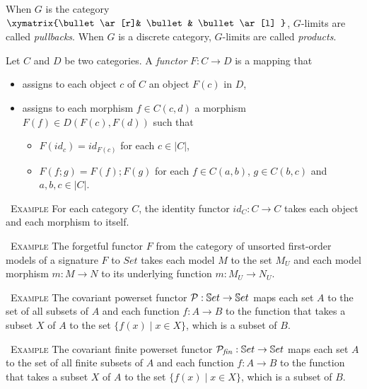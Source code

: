 \documentclass[10pt, a4paper]{isov2}
\renewenvironment{example}[0]{\ \newline \textsc{Example}\quad }{}
\begin{document}
 When $G$ is the category $\xymatrix{\bullet \ar[r]& \bullet & \bullet \ar[l] }$, $G$-limits are
called  \emph{pullbacks}.
 When $G$ is a discrete category,
 $G$-limits are called \emph{products}.



\begin{definition}
Let $C$ and $D$ be two categories. A \emph{functor} $F: C \to D $ is a mapping that 
\begin{itemize}
  \item assigns to each object $c$ of $C$ an object $F(c)$ in $D$,
  \item assigns to each morphism $f\in C(c,d)$ a morphism $F(f)\in D(F(c), F(d))$ such that 
   \begin{itemize}
     \item $F(\mathit{id}_c) = \mathit{id}_{F(c)} $ for each $c\in |C|$,
     \item $F(f;g) = F(f);F(g)$ for each $f\in C(a,b)$, $g\in C(b,c)$ and $a,b,c \in |C|$.
   \end{itemize}
\end{itemize}
\end{definition}

\begin{example}
For each category $C$, the identity functor $\mathit{id}_C : C \to C$ takes 
each object and each morphism to itself. 
\end{example}

\begin{example}
The forgetful functor $F$ from the category of unsorted first-order models of a 
signature $F$ to $Set$ takes each model $M$ to the set $M_U$ and each
model morphism $m:M\to N$ to its underlying function $m:M_U \to N_U$.
\end{example}

\begin{example}
The covariant powerset functor $\mathcal{P} : \mathbb{S}et \to \mathbb{S}et$
maps each set $A$ to the set of all subsets of $A$ and each function $f:A \to B$
to the function that takes a subset $X$ of $A$ to the set $\{f(x) \mid x\in X\}$,
which is a subset of $B$. 
\end{example}

\begin{example}
The covariant finite powerset functor $\mathcal{P}_{\mathit{fin}} : \mathbb{S}et \to \mathbb{S}et$
maps each set $A$ to the set of all finite subsets of $A$ and each function $f:A \to B$
to the function that takes a subset $X$ of $A$ to the set $\{f(x) \mid x\in X\}$,
which is a subset of $B$. 
\end{example}
 
\end{document}
